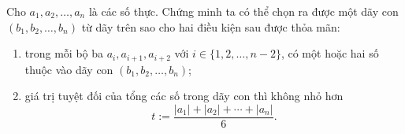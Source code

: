 \begin{bt}%
	Cho $a_1, a_2,\ldots, a_n$ là các số thực. Chứng minh ta có thể chọn ra được một dãy con $(b_1,b_2,\ldots,b_n)$ từ dãy trên sao cho hai điều kiện sau được thỏa mãn:
	\begin{enumerate}
		
		\item trong mỗi bộ ba $a_i,a_{i+1},a_{i+2}$ với $i \in \{1,2, \ldots,n-2\}$, có một hoặc hai số thuộc vào dãy con $(b_1,b_2,\ldots, b_n)$;
		\item giá trị tuyệt đối của tổng các số trong dãy con thì không nhỏ hơn
		$$t:=\dfrac{|a_1|+|a_2|+\cdots+|a_n|}{6}.$$
		
	\end{enumerate}
\end{bt}
